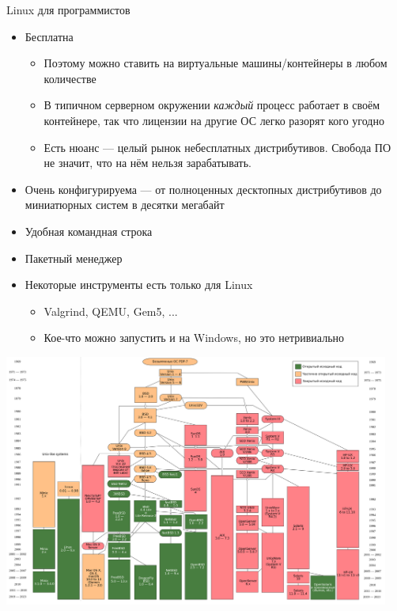\documentclass{../../slides-style}
\begin{document}
    \begin{frame}{Linux для программистов}
        \begin{itemize}
            \item Бесплатна
            \begin{itemize}
                \item Поэтому можно ставить на виртуальные машины/контейнеры в любом количестве
                \item В типичном серверном окружении \emph{каждый} процесс работает в своём контейнере, так что лицензии на другие ОС легко разорят кого угодно
                \item Есть нюанс --- целый рынок небесплатных дистрибутивов. Свобода ПО не значит, что на нём нельзя зарабатывать.
            \end{itemize}
            \item Очень конфигурируема --- от полноценных десктопных дистрибутивов до миниатюрных систем в десятки мегабайт
            \item Удобная командная строка
            \item Пакетный менеджер
            \item Некоторые инструменты есть только для Linux
            \begin{itemize}
                \item Valgrind, QEMU, Gem5, ...
                \item Кое-что можно запустить и на Windows, но это нетривиально
            \end{itemize}
        \end{itemize}
    \end{frame}

    \begin{frame}
        \begin{center}
            \includegraphics[width=0.95\textwidth]{unixHistory.png}
        \end{center}
    \end{frame}
\end{document}
